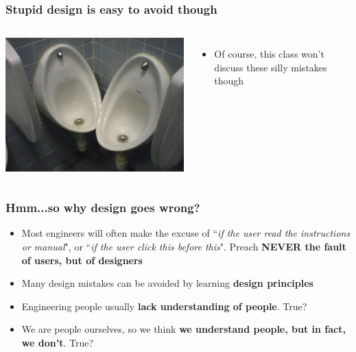 \documentclass{beamer}
\begin{document}
\begin{frame}
\frametitle{Stupid design is easy to avoid though}
\begin{columns}[c] %
	
	\centering
	\includegraphics[width=1\linewidth]{toiletb}\newline
	
	\begin{itemize}
		\item Of course, this class won't discuss these silly mistakes though %
	\end{itemize}
\end{columns}
\end{frame}


\begin{frame}
\frametitle{Hmm...so why design goes wrong?}
\begin{itemize}
	\item Most engineers will often make the excuse of ``\textit{if the user read the instructions or manual}", or ``\textit{if the user click this before this}".  Preach \textbf{NEVER the fault of users, but of designers}
	\item Many design mistakes can be avoided by learning \textbf{design principles} %
	\item Engineering people usually \textbf{lack understanding of people}.  True? %
	\item We are people ourselves, so we think \textbf{we understand people, but in fact, we don't}.  True? %
\end{itemize}
\end{frame}
\end{document}
